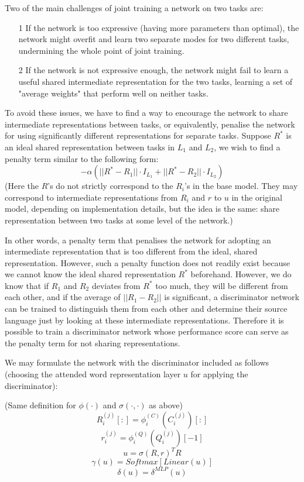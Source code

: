 \documentclass[]{article}
\begin{document}
Two of the main challenges of joint training a network on two tasks are:
\begin{itemize}
	\item[1] If the network is too expressive (having more parameters than optimal), the network might overfit and learn two separate modes for two different tasks, undermining the whole point of joint training.
	\item[2] If the network is not expressive enough, the network might fail to learn a useful shared intermediate representation for the two tasks, learning a set of "average weights" that perform well on neither tasks.
\end{itemize}

To avoid these issues, we have to find a way to encourage the network to share intermediate representations between tasks, or equivalently, penalise the network for using significantly different representations for separate tasks. Suppose $R^*$ is an ideal shared representation between tasks in $L_1$ and $L_2$, we wish to find a penalty term similar to the following form:
\[ -\alpha (||R^* - R_1|| \cdot I_{L_1} + ||R^* - R_2|| \cdot I_{L_2}) \]
(Here the $R$'s do not strictly correspond to the $R_i$'s in the base model. They may correspond to intermediate representations from $R_i$ and $r$ to $u$ in the original model, depending on implementation details, but the idea is the same: share representation between two tasks at some level of the network.)

In other words, a penalty term that penalises the network for adopting an intermediate representation that is too different from the ideal, shared representation. However, such a penalty function does not readily exist because we cannot know the ideal shared representation $R^*$ beforehand. However, we do know that if $R_1$ and $R_2$ deviates from $R^*$ too much, they will be different from each other, and if the average of $||R_1 - R_2||$ is significant, a discriminator network can be trained to distinguish them from each other and determine their source language just by looking at these intermediate representations. Therefore it is possible to train a discriminator network whose performance score can serve as the penalty term for not sharing representations.

We may formulate the network with the discriminator included as follows (choosing the attended word representation layer $u$ for applying the discriminator):

(Same definition for $\phi(\cdot)$ and $\sigma(\cdot, \cdot)$ as above)
\[ R_i^{(j)}[:]=\phi_i^{(C)}(C_i^{(j)})[:] \] 
\[ r_i^{(j)}=\phi_i^{(Q)}(Q_i^{(j)})[-1] \]
\[ u = \sigma(R, r)^T R \]
\[ \gamma(u) = Softmax[Linear(u)] \]
\[ \delta(u) = \delta^{MLP}(u) \]
\end{document}
